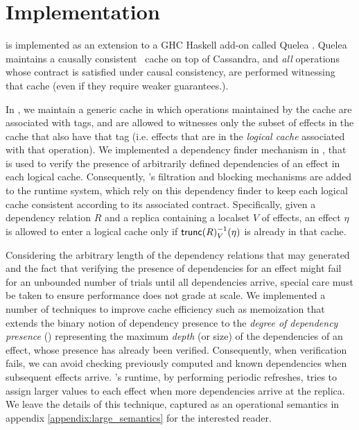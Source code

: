 \section{Implementation}
\label{sec:alg}
\tool is implemented as an extension to a GHC Haskell add-on called
Quelea \cite{quelea}.  Quelea maintains a causally
consistent~\cite{bolton} cache on top of Cassandra, and \emph{all}
operations whose contract is satisfied under causal consistency, are
performed witnessing that cache (even if they require weaker
guarantees.).

In \tool, we maintain a generic cache in which operations maintained
by the cache are associated with tags, and are allowed to witnesses
only the subset of effects in the cache that also have that tag
(i.e. effects that are in the \emph{logical cache} associated with
that operation). We implemented a dependency finder mechanism in
\tool, that is used to verify the presence of arbitrarily defined
dependencies of an effect in each logical cache. Consequently, \tool's
filtration and blocking mechanisms are added to the runtime system,
which rely on this dependency finder to keep each logical cache
consistent according to its associated contract. Specifically, given a
dependency relation $R$ and a replica containing a localset $V$ of
effects, an effect $\eta$ is allowed to enter a logical cache only if
$\trunc{R}_V^{-1}(\eta)$ is already in that cache.


Considering the arbitrary length of the dependency relations that may
generated and the fact that verifying the presence of dependencies for
an effect might fail for an unbounded number of trials until all
dependencies arrive, special care must be taken to ensure performance
does not grade at scale.  We implemented a number of techniques to
improve cache efficiency such as memoization that extends the binary
notion of dependency presence to the \emph{degree of dependency
  presence} (\DDP{}) representing the maximum \emph{depth} (or size)
of the dependencies of an effect, whose presence has already been
verified.  Consequently, when verification fails, we can avoid
checking previously computed and known dependencies when subsequent
effects arrive.  \tool's runtime, by performing periodic \DDP{}
refreshes, tries to assign larger \DDP{} values to each effect when
more dependencies arrive at the replica. We leave the details of this
technique, captured as an operational semantics in appendix
\ref{appendix:large_semantics} for the interested reader.








